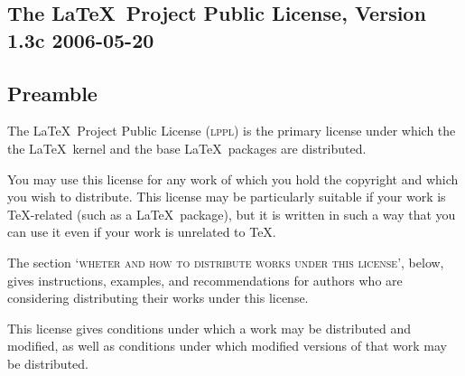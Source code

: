 \begin{LPPLicense}
  \providecommand{\LPPLsection}{\section*}
  \providecommand{\LPPLsubsection}{\subsection*}
  \providecommand{\LPPLsubsubsection}{\subsubsection*}
  \providecommand{\LPPLparagraph}{\paragraph*}
  \providecommand*{\LPPLfile}[1]{\texttt{#1}}
  \providecommand*{\LPPLdocfile}[1]{`\LPPLfile{#1.tex}'}
  \providecommand*{\LPPL}{\textsc{lppl}}

  \LPPLsection{The \LaTeX\ Project Public License, Version 1.3c 2006-05-20}
  \label{LPPL:LPPL}


  \LPPLsubsection{Preamble}
  \label{LPPL:Preamble}
  
  The \LaTeX\ Project Public License (\LPPL) is the primary license
  under which the the \LaTeX\ kernel and the base \LaTeX\ packages are
  distributed.

  You may use this license for any work of which you hold the
  copyright and which you wish to distribute.  This license may be
  particularly suitable if your work is \TeX-related (such as a
  \LaTeX\ package), but it is written in such a way that you can use 
  it even if your work is unrelated to \TeX.

  The section `\textsc{wheter and how to distribute works under this
    license}', below, gives instructions, examples, and
  recommendations 
  for authors who are considering distributing their works under this
  license.

  This license gives conditions under which a work may be distributed
  and modified, as well as conditions under which modified versions of
  that work may be distributed.


\end{LPPLicense}
